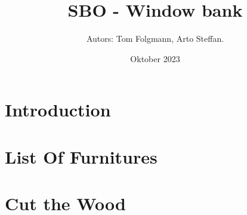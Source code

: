 \documentclass[
    oneside, 
    footinclude=off, 
    captions=tableheading, 
    DIV=12;usenames,
    dvipsnames
]{scrartcl}
\begin{document}
    \title{SBO - Window bank}
    \subtitle{}
    \author{Autors: Tom Folgmann, Arto Steffan.}
    \date{Oktober 2023}
    \maketitle
    \thispagestyle{empty}
    \section*{Introduction}
        

    \newpage



    \tableofcontents
    \thispagestyle{empty}	
    \newpage
    \setcounter{page}{1}


\newpage
\section{List Of Furnitures}
    

\newpage
\section{Cut the Wood}
    


\newpage
    \listoffigures
    \listoftables


%
\end{document}
